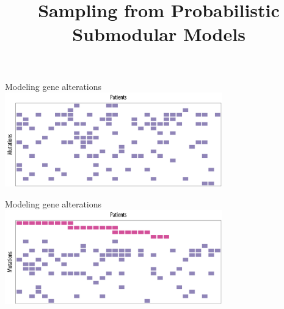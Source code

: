 \documentclass[mathserif]{beamer}
\title[Sampling from Probabilistic Submodular Models]
{Sampling from Probabilistic Submodular Models}
\author[Alkis Gotovos]{}
\begin{document}



\begin{frame}{Modeling gene alterations}
\centering
\includegraphics[width=3.7in]{figures/example1.pdf}
\end{frame}

\begin{frame}{Modeling gene alterations}
\centering
\includegraphics[width=3.7in]{figures/example1_rep.pdf}
\end{frame}
\end{document}
